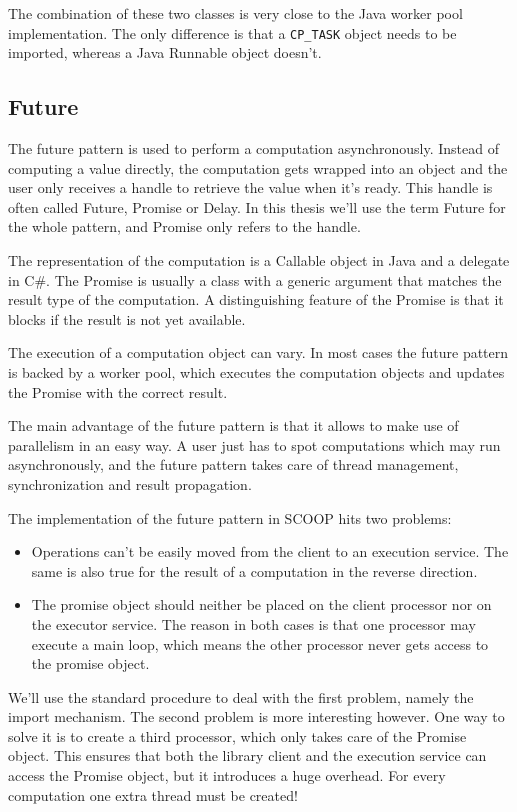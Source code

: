 \documentclass[a4paper,10pt]{report}
\begin{document}
The combination of these two classes is very close to the Java worker pool implementation.
The only difference is that a \lstinline!CP_TASK! object needs to be imported, whereas a Java Runnable object doesn't.

\subsection{Future}

The future pattern is used to perform a computation asynchronously.
Instead of computing a value directly, the computation gets wrapped into an object and the user only receives a handle to retrieve the value when it's ready.
This handle is often called Future, Promise or Delay.
In this thesis we'll use the term Future for the whole pattern, and Promise only refers to the handle.

The representation of the computation is a Callable object in Java and a delegate in C\#.
The Promise is usually a class with a generic argument that matches the result type of the computation.
A distinguishing feature of the Promise is that it blocks if the result is not yet available.

The execution of a computation object can vary.
In most cases the future pattern is backed by a worker pool, which executes the computation objects and updates the Promise with the correct result.

The main advantage of the future pattern is that it allows to make use of parallelism in an easy way.
A user just has to spot computations which may run asynchronously, and the future pattern takes care of thread management, synchronization and result propagation.

The implementation of the future pattern in SCOOP hits two problems:
\begin{itemize}
 \item Operations can't be easily moved from the client to an execution service.
 The same is also true for the result of a computation in the reverse direction.
 \item The promise object should neither be placed on the client processor nor on the executor service.
 The reason in both cases is that one processor may execute a main loop, which means the other processor never gets access to the promise object.
\end{itemize}

We'll use the standard procedure to deal with the first problem, namely the import mechanism.
The second problem is more interesting however.
One way to solve it is to create a third processor, which only takes care of the Promise object.
This ensures that both the library client and the execution service can access the Promise object, but it introduces a huge overhead.
For every computation one extra thread must be created!
\end{document}
